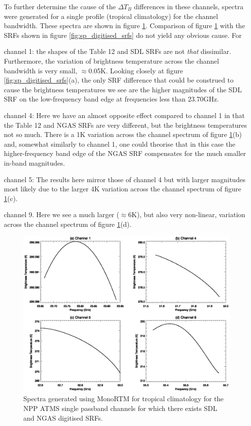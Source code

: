 To further determine the cause of the $\Delta T_B$ differences in these channels, spectra were generated for a single profile (tropical climatology) for the channel bandwidth. These spectra are shown in figure \ref{fig:ch1_4_5_9.spectra}. Comparison of figure \ref{fig:ch1_4_5_9.spectra} with the SRFs shown in figure \ref{fig:sp_digitised_srfs} do not yield any obvious cause. For

channel 1: the shapes of the Table 12 and SDL SRFs are not \textit{that} dissimilar. Furthermore, the variation of brightness temperature across the channel bandwidth is very small, $\approx$0.05K. Looking closely at figure \ref{fig:sp_digitised_srfs}(a), the only SRF difference that could be construed to cause the brightness temperatures we see are the higher magnitudes of the SDL SRF on the low-frequency band edge at frequencies less than 23.70GHz.

channel 4: Here we have an almost opposite effect compared to channel 1 in that the Table 12 and NGAS SRFs are very different, but the brightness temperatures not so much. There is a 1K variation across the channel spectrum of figure \ref{fig:ch1_4_5_9.spectra}(b) and, somewhat similarly to channel 1, one could theorise that in this case the higher-frequency band edge of the NGAS SRF compensates for the much smaller in-band magnitudes.

channel 5: The results here mirror those of channel 4 but with larger magnitudes most likely due to the larger 4K variation across the channel spectrum of figure \ref{fig:ch1_4_5_9.spectra}(c).

channel 9. Here we see a much larger ($\approx$6K), but also very non-linear, variation across the channel spectrum of figure \ref{fig:ch1_4_5_9.spectra}(d).
 
\begin{figure}[htp]
  \centering
  \includegraphics[scale=1.0]{graphics/spectra/ch1_4_5_9.eps}
  \caption{Spectra generated using MonoRTM for tropical climatology for the NPP ATMS single passband channels for which there exists SDL and NGAS digitised SRFs.}
  \label{fig:ch1_4_5_9.spectra}
\end{figure}


